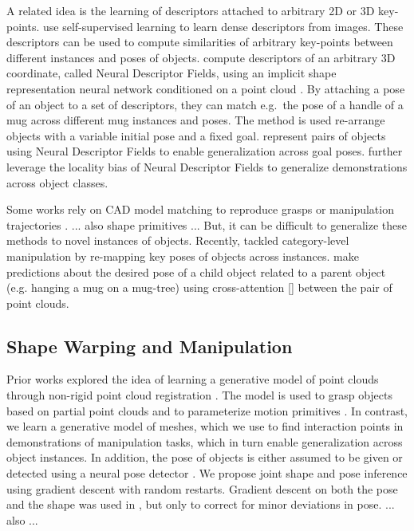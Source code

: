 \documentclass{article}
\begin{document}
A related idea is the learning of descriptors attached to arbitrary 2D or 3D key-points. \citet{florence18dense} use self-supervised learning to learn dense descriptors from images. These descriptors can be used to compute similarities of arbitrary key-points between different instances and poses of objects. \citet{chen22neural} compute descriptors of an arbitrary 3D coordinate, called Neural Descriptor Fields, using an implicit shape representation neural network conditioned on a point cloud \cite{mescheder19occupancy}. By attaching a pose of an object to a set of descriptors, they can match e.g.~the pose of a handle of a mug across different mug instances and poses. The method is used re-arrange objects with a variable initial pose and a fixed goal. \citet{simeonov22se} represent pairs of objects using Neural Descriptor Fields to enable generalization across goal poses. \citet{chun23local} further leverage the locality bias of Neural Descriptor Fields to generalize demonstrations across object classes.

Some works rely on CAD model matching to reproduce grasps or manipulation trajectories  \cite{klank09realtime,brook11collaborative,beetz11robotic,jakel12learning}. ... also shape primitives \cite{miller03automatic} ... But, it can be difficult to generalize these methods to novel instances of objects. Recently, \citet{wen22you} tackled category-level manipulation by re-mapping key poses of objects across instances. \citet{pan22taxpose} make predictions about the desired pose of a child object related to a parent object (e.g. hanging a mug on a mug-tree) using cross-attention [] between the pair of point clouds.


\subsection{Shape Warping and Manipulation}

Prior works explored the idea of learning a generative model of point clouds through non-rigid point cloud registration \cite{rodriguez18transferring,rodriguez18transferringa,klamt18supervised,thompson21shapebased}. The model is used to grasp objects based on partial point clouds \cite{rodriguez18transferring,rodriguez18transferringa,klamt18supervised} and to parameterize motion primitives \cite{thompson21shapebased}. In contrast, we learn a generative model of meshes, which we use to find interaction points in demonstrations of manipulation tasks, which in turn enable generalization across object instances. In addition, the pose of objects is either assumed to be given \cite{thompson21shapebased} or detected using a neural pose detector \cite{klamt18supervised}. We propose joint shape and pose inference using gradient descent with random restarts. Gradient descent on both the pose and the shape was used in \cite{rodriguez18transferring,rodriguez18transferringa}, but only to correct for minor deviations in pose. ... also \cite{simeonov20long,you21omnihang,menon22viewpoint,lu22online,wen22you,cong23comprehensive} ...
\end{document}
